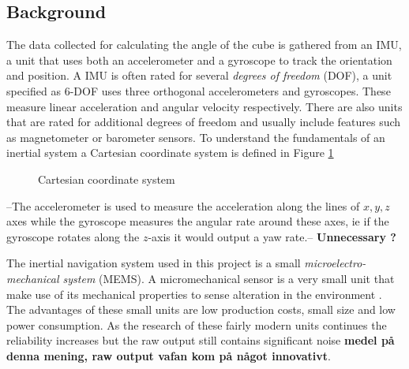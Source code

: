 \documentclass[a4paper,11pt]{kth-mag}
\begin{document}
\subsection{Background}
The data collected for calculating the angle of the cube is gathered from an IMU, a unit that uses both an accelerometer and a gyroscope to track the orientation and position. A IMU is often rated for several \textit{degrees of freedom} (DOF), a unit specified as 6-DOF uses three orthogonal accelerometers and gyroscopes. These measure linear acceleration and angular velocity respectively. There are also units that are rated for additional degrees of freedom and usually include features such as magnetometer or barometer sensors.   
To understand the fundamentals of an inertial system a Cartesian coordinate system is defined in Figure \ref{Figure: cartesian}

\begin{figure}[!hbt] 
\centering
{}
%
%

\caption{Cartesian coordinate system}
\label{Figure: cartesian}
\end{figure}
 
 --The accelerometer is used to measure the acceleration along the lines of $x,y,z$ axes while the gyroscope measures the angular rate around these axes, ie if the gyroscope rotates along the $z$-axis it would output a yaw rate.--  \textbf{Unnecessary ?}
 
The inertial navigation system used in this project is a small \textit{microelectro-mechanical system} (MEMS). A micromechanical sensor is a very small unit that make use of its mechanical properties to sense alteration in the environment \cite{ref:accelerometero}. The advantages of these small units are low production costs, small size and low power consumption. As the research of these fairly modern units continues the reliability increases but the raw output still contains significant noise \textbf{medel på denna mening, raw output vafan kom på något innovativt}. \cite{IMUintro}
\end{document}
